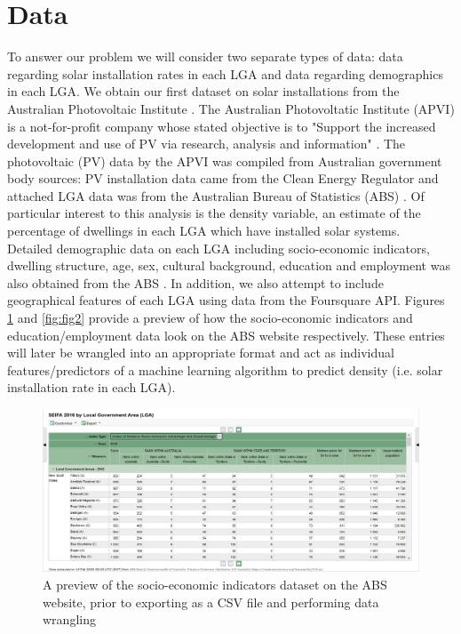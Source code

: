\documentclass{article}
\begin{document}
\section{Data}

To answer our problem we will consider two separate types of data: data regarding solar installation rates in each LGA and data regarding demographics in each LGA. We obtain our first dataset on solar installations from the Australian Photovoltaic Institute \cite{pvdata}. The Australian Photovoltatic Institute (APVI) is a not-for-profit company whose stated objective is to "Support the increased development and use of PV via research, analysis and information" \cite{apvi}. The photovoltaic (PV) data by the APVI was compiled from Australian government body sources: PV installation data came from the Clean Energy Regulator \cite{pvdata, ceg} and attached LGA data was from the Australian Bureau of Statistics (ABS) \cite{pvdata, abspv}. Of particular interest to this analysis is the density variable, an estimate of the percentage of dwellings in each LGA which have installed solar systems. \\

Detailed demographic data on each LGA including socio-economic indicators, dwelling structure, age, sex, cultural background, education and employment was also obtained from the ABS \cite{abs}. In addition, we also attempt to include geographical features of each LGA using data from the Foursquare API. Figures \ref{fig:fig1} and \ref{fig:fig2} provide a preview of how the socio-economic indicators and education/employment data look on the ABS website respectively. These entries will later be wrangled into an appropriate format and act as individual features/predictors of a machine learning algorithm to predict density (i.e. solar installation rate in each LGA).

\begin{figure}
  \includegraphics[width=\linewidth]{fig1.png}
  \caption{A preview of the socio-economic indicators dataset on the ABS website, prior to exporting as a CSV file and performing data wrangling}
  \label{fig:fig1}
\end{figure}
\end{document}
